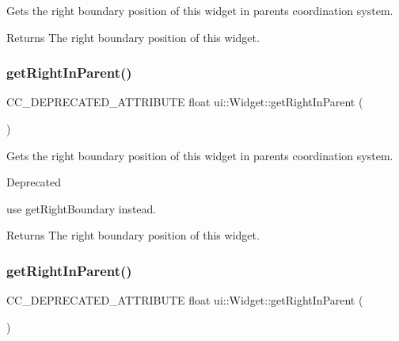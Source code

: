 Gets the right boundary position of this widget in parent\textquotesingle{}s coordination system. \begin{DoxyReturn}{Returns}
The right boundary position of this widget. 
\end{DoxyReturn}
\mbox{\label{classui_1_1Widget_ad64a744c35c0ee24d1239c02dad5c03c}} 
\subsubsection{\texorpdfstring{get\+Right\+In\+Parent()}{getRightInParent()}\hspace{0.1cm}{\footnotesize\ttfamily [1/2]}}
{\footnotesize\ttfamily C\+C\+\_\+\+D\+E\+P\+R\+E\+C\+A\+T\+E\+D\+\_\+\+A\+T\+T\+R\+I\+B\+U\+TE float ui\+::\+Widget\+::get\+Right\+In\+Parent (\begin{DoxyParamCaption}{ }\end{DoxyParamCaption})\hspace{0.3cm}{\ttfamily [inline]}}

Gets the right boundary position of this widget in parent\textquotesingle{}s coordination system. \begin{DoxyRefDesc}{Deprecated}
\item[\hyperlink{deprecated__deprecated000170}{Deprecated}]use {\ttfamily get\+Right\+Boundary} instead. \end{DoxyRefDesc}
\begin{DoxyReturn}{Returns}
The right boundary position of this widget. 
\end{DoxyReturn}
\mbox{\label{classui_1_1Widget_ad64a744c35c0ee24d1239c02dad5c03c}} 
\subsubsection{\texorpdfstring{get\+Right\+In\+Parent()}{getRightInParent()}\hspace{0.1cm}{\footnotesize\ttfamily [2/2]}}
{\footnotesize\ttfamily C\+C\+\_\+\+D\+E\+P\+R\+E\+C\+A\+T\+E\+D\+\_\+\+A\+T\+T\+R\+I\+B\+U\+TE float ui\+::\+Widget\+::get\+Right\+In\+Parent (\begin{DoxyParamCaption}{ }\end{DoxyParamCaption})\hspace{0.3cm}{\ttfamily [inline]}}

